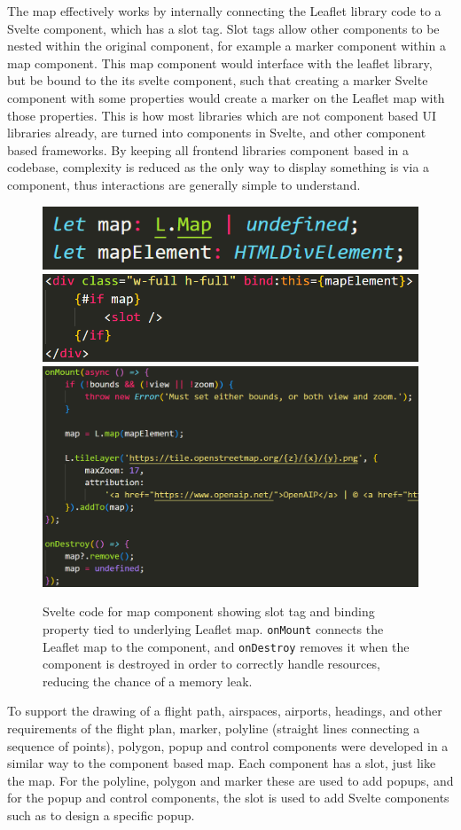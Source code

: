 The map effectively works by internally connecting the Leaflet library code to a Svelte component, which has a slot tag. Slot tags allow other components to be nested within the original component, for example a marker component within a map component. This map component would interface with the leaflet library, but be bound to the its svelte component, such that creating a marker Svelte component with some properties would create a marker on the Leaflet map with those properties. This is how most libraries which are not component based UI libraries already, are turned into components in Svelte, and other component based frameworks. By keeping all frontend libraries component based in a codebase, complexity is reduced as the only way to display something is via a component, thus interactions are generally simple to understand.

\begin{figure}
    \centering
    \includegraphics[width=0.25\linewidth]{document-resources//images/map-leaflet-variables.png}
    \includegraphics[width=0.25\linewidth]{document-resources//images/map-svelte-component-rough.png}
    \includegraphics[width=0.25\linewidth]{document-resources//images/map-onmount.png}
    \caption{Svelte code for map component showing slot tag and binding property tied to underlying Leaflet map. \texttt{onMount} connects the Leaflet map to the component, and \texttt{onDestroy} removes it when the component is destroyed in order to correctly handle resources, reducing the chance of a memory leak.}
    \label{fig:map-svelte-component}
\end{figure}

To support the drawing of a flight path, airspaces, airports, headings, and other requirements of the flight plan, marker, polyline (straight lines connecting a sequence of points), polygon, popup and control components were developed in a similar way to the component based map. Each component has a slot, just like the map. For the polyline, polygon and marker these are used to add popups, and for the popup and control components, the slot is used to add Svelte components such as to design a specific popup. 

